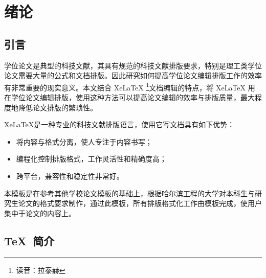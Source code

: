 
%
%
%


\chapter{绪论}
\label{chap01}

\section{引言}

学位论文是典型的科技文献，其具有规范的科技文献排版要求，特别是理工类学位论文需要大量的公式和文档排版。因此研究如何提高学位论文编辑排版工作的效率有非常重要的现实意义。本文结合 Xe\LaTeX{} \footnote{读音：拉泰赫}文档编辑的特点，将 Xe\LaTeX{} 用在学位论文编辑排版，使用这种方法可以提高论文编辑的效率与排版质量，最大程度地降低论文排版的繁琐性。

Xe\LaTeX{}是一种专业的科技文献排版语言，使用它写文档具有如下优势：

\begin{itemize}
  \item 将内容与格式分离，使人专注于内容书写；
  \item 编程化控制排版格式，工作灵活性和精确度高；
  \item 跨平台，兼容性和稳定性非常好。
\end{itemize}

本模板是在参考其他学校论文模板的基础上，根据哈尔滨工程的大学对本科生与研究生论文的格式要求制作，通过此模板，所有排版格式化工作由模板完成，使用户集中于论文的内容上。

\section{TeX~简介}

